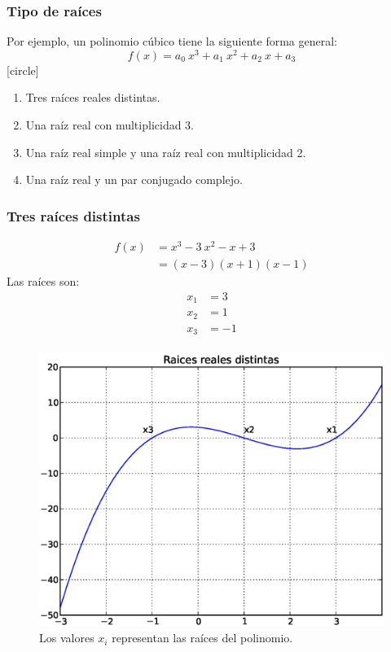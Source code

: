 \begin{frame}
\frametitle{Tipo de raíces}
Por ejemplo, un polinomio cúbico tiene la siguiente
forma general:
\[ f(x) = a_{0} \: x^{3} + a_{1} \: x^{2} + a_{2} \: x + a_{3}\]
[circle]
\begin{enumerate}[<+->]
\item Tres raíces reales distintas.
\item Una raíz real con multiplicidad 3.
\item Una raíz real simple y una raíz real con multiplicidad 2.
\item Una raíz real y un par conjugado complejo.
\end{enumerate}
\end{frame}
\begin{frame}[fragile]
\captionsetup{justification=centering}
\frametitle{Tres raíces distintas}
\begin{minipage}{5cm}
\fontsize{12}{12}\selectfont
\begin{align*}
f(x) & = x^{3} - 3 \: x^{2} - x + 3 \\
&= (x - 3)(x + 1)(x - 1)
\end{align*}
Las raíces son:
\begin{align*}
x_{1} &= 3 \\
x_{2} &= 1 \\
x_{3} &= -1 \\
\end{align*}
\end{minipage}
\hspace{0.5cm}
\begin{minipage}{4.5cm}
\begin{figure}
	\centering
	\includegraphics[scale=0.3]{Imagenes/raices01.eps}
	\caption{Los valores $x_{i}$ representan las raíces del polinomio.}
\end{figure}
\end{minipage}
\end{frame}
